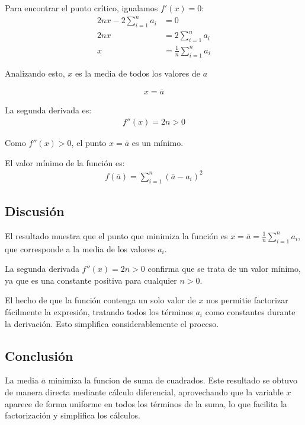 \documentclass{article}
\begin{document}
Para encontrar el punto crítico, igualamos $f'(x) = 0$:
\begin{align}
    2nx - 2\sum_{i=1}^{n} a_i &= 0 \\
    2nx &= 2\sum_{i=1}^{n} a_i \\
    x &= \frac{1}{n}\sum_{i=1}^{n} a_i 
\end{align}

Analizando esto, $x$ es la media de todos los valores de $a$

\begin{align}
    x = \bar{a}
\end{align}

La segunda derivada es:
\begin{align}
f''(x) = 2n > 0
\end{align}

Como $f''(x) > 0$, el punto $x = \bar{a}$ es un mínimo.

El valor mínimo de la función es:
\begin{align}
f(\bar{a}) = \sum_{i=1}^{n} (\bar{a} - a_i)^2
\end{align}

\subsection{Discusión}

El resultado muestra que el punto que minimiza la función es $x = \bar{a} = \frac{1}{n}\sum_{i=1}^{n} a_i$, que corresponde a la media de los valores $a_i$.

La segunda derivada $f''(x) = 2n > 0$ confirma que se trata de un valor mínimo, ya que es una constante positiva para cualquier $n > 0$.

El hecho de que la función contenga un solo valor de $x$ nos permitie factorizar fácilmente la expresión, tratando todos los términos $a_i$ como constantes durante la derivación. Esto simplifica considerablemente el proceso.

\subsection{Conclusión}

La media $\bar{a}$ minimiza la funcion de suma de cuadrados. Este resultado se obtuvo de manera directa mediante cálculo diferencial, aprovechando que la variable $x$ aparece de forma uniforme en todos los términos de la suma, lo que facilita la factorización y simplifica los cálculos.

\end{document}
